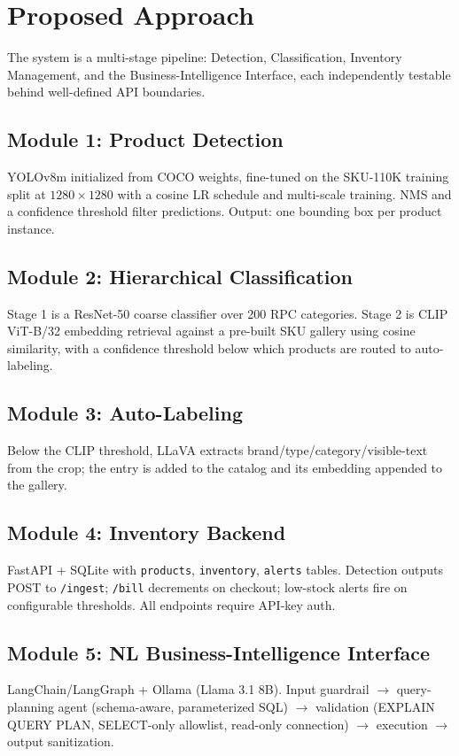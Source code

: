 \section{Proposed Approach}
The system is a multi-stage pipeline: Detection, Classification, Inventory Management, and the
Business-Intelligence Interface, each independently testable behind well-defined API boundaries.

\subsection{Module 1: Product Detection}
YOLOv8m initialized from COCO weights, fine-tuned on the SKU-110K training split at $1280\times1280$
with a cosine LR schedule and multi-scale training. NMS and a confidence threshold filter
predictions. Output: one bounding box per product instance.

\subsection{Module 2: Hierarchical Classification}
Stage 1 is a ResNet-50 coarse classifier over 200 RPC categories. Stage 2 is CLIP ViT-B/32
embedding retrieval against a pre-built SKU gallery using cosine similarity, with a confidence
threshold below which products are routed to auto-labeling.

\subsection{Module 3: Auto-Labeling}
Below the CLIP threshold, LLaVA extracts brand/type/category/visible-text from the crop; the entry
is added to the catalog and its embedding appended to the gallery.

\subsection{Module 4: Inventory Backend}
FastAPI + SQLite with \texttt{products}, \texttt{inventory}, \texttt{alerts} tables. Detection
outputs POST to \texttt{/ingest}; \texttt{/bill} decrements on checkout; low-stock alerts fire on
configurable thresholds. All endpoints require API-key auth.

\subsection{Module 5: NL Business-Intelligence Interface}
LangChain/LangGraph + Ollama (Llama 3.1 8B). Input guardrail $\rightarrow$ query-planning agent
(schema-aware, parameterized SQL) $\rightarrow$ validation (EXPLAIN QUERY PLAN, SELECT-only
allowlist, read-only connection) $\rightarrow$ execution $\rightarrow$ output sanitization.
